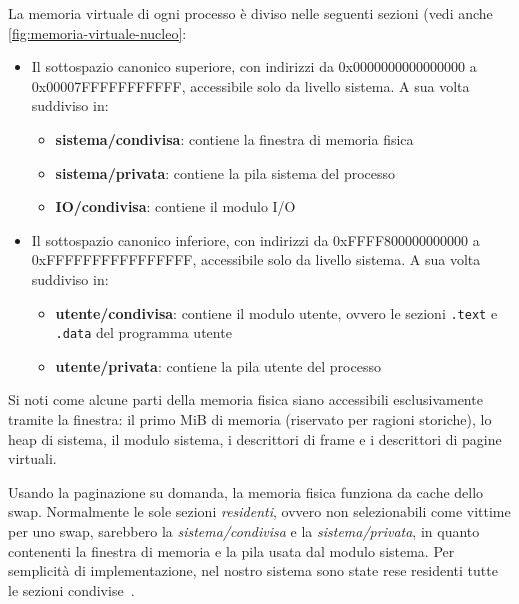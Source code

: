 La memoria virtuale di ogni processo è diviso nelle seguenti sezioni (vedi anche \ref{fig:memoria-virtuale-nucleo}: 
\begin{itemize}
	\item Il sottospazio canonico superiore, con indirizzi da 0x0000000000000000 a \linebreak 0x00007FFFFFFFFFFF, accessibile solo da livello sistema. A sua volta suddiviso in:
	\begin{itemize}
		\item \textbf{sistema/condivisa}: contiene la finestra di memoria fisica
		\item \textbf{sistema/privata}: contiene la pila sistema del processo
		\item \textbf{IO/condivisa}: contiene il modulo I/O
	\end{itemize}
	\item Il sottospazio canonico inferiore, con indirizzi da 0xFFFF800000000000 a \linebreak 0xFFFFFFFFFFFFFFFF, accessibile solo da livello sistema. A sua volta suddiviso in:
	\begin{itemize}
		\item \textbf{utente/condivisa}: contiene il modulo utente, ovvero le sezioni \texttt{.text} e \texttt{.data} del programma utente
		\item \textbf{utente/privata}: contiene la pila utente del processo
	\end{itemize}
\end{itemize}
Si noti come alcune parti della memoria fisica siano accessibili esclusivamente tramite la finestra: il primo MiB di memoria (riservato per ragioni storiche), lo heap di sistema, il modulo sistema, i descrittori di frame e i descrittori di pagine virtuali.

Usando la paginazione su domanda, la memoria fisica funziona da cache dello swap. Normalmente le sole sezioni \emph{residenti}, ovvero non selezionabili come vittime per uno swap, sarebbero la \emph{sistema/condivisa} e la \emph{sistema/privata}, in quanto contenenti la finestra di memoria e la pila usata dal modulo sistema. Per semplicità di implementazione, nel nostro sistema sono state rese residenti tutte le sezioni condivise~\cite{lettieri:paginazione-nel-nucleo}.
